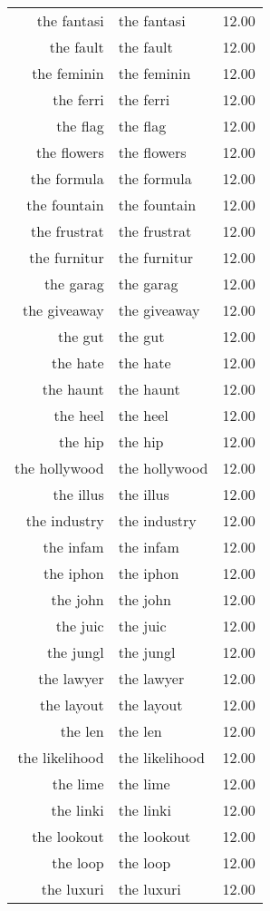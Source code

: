 \begin{table}[ht]
\begin{tabular}{rlr}
  the fantasi & the fantasi & 12.00 \\ 
  the fault & the fault & 12.00 \\ 
  the feminin & the feminin & 12.00 \\ 
  the ferri & the ferri & 12.00 \\ 
  the flag & the flag & 12.00 \\ 
  the flowers & the flowers & 12.00 \\ 
  the formula & the formula & 12.00 \\ 
  the fountain & the fountain & 12.00 \\ 
  the frustrat & the frustrat & 12.00 \\ 
  the furnitur & the furnitur & 12.00 \\ 
  the garag & the garag & 12.00 \\ 
  the giveaway & the giveaway & 12.00 \\ 
  the gut & the gut & 12.00 \\ 
  the hate & the hate & 12.00 \\ 
  the haunt & the haunt & 12.00 \\ 
  the heel & the heel & 12.00 \\ 
  the hip & the hip & 12.00 \\ 
  the hollywood & the hollywood & 12.00 \\ 
  the illus & the illus & 12.00 \\ 
  the industry & the industry & 12.00 \\ 
  the infam & the infam & 12.00 \\ 
  the iphon & the iphon & 12.00 \\ 
  the john & the john & 12.00 \\ 
  the juic & the juic & 12.00 \\ 
  the jungl & the jungl & 12.00 \\ 
  the lawyer & the lawyer & 12.00 \\ 
  the layout & the layout & 12.00 \\ 
  the len & the len & 12.00 \\ 
  the likelihood & the likelihood & 12.00 \\ 
  the lime & the lime & 12.00 \\ 
  the linki & the linki & 12.00 \\ 
  the lookout & the lookout & 12.00 \\ 
  the loop & the loop & 12.00 \\ 
  the luxuri & the luxuri & 12.00 \\ 

\end{tabular}
\end{table}

